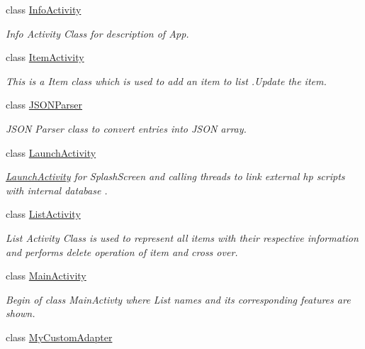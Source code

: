 \begin{DoxyCompactItemize}
class \hyperlink{classcom_1_1example_1_1santh_1_1shoppinglist_1_1_info_activity}{Info\+Activity}
\begin{DoxyCompactList}\small\item\em Info Activity Class for description of App. \end{DoxyCompactList}\item 
class \hyperlink{classcom_1_1example_1_1santh_1_1shoppinglist_1_1_item_activity}{Item\+Activity}
\begin{DoxyCompactList}\small\item\em This is a Item class which is used to add an item to list .Update the item. \end{DoxyCompactList}\item 
class \hyperlink{classcom_1_1example_1_1santh_1_1shoppinglist_1_1_j_s_o_n_parser}{J\+S\+O\+N\+Parser}
\begin{DoxyCompactList}\small\item\em J\+S\+ON Parser class to convert entries into J\+S\+ON array. \end{DoxyCompactList}\item 
class \hyperlink{classcom_1_1example_1_1santh_1_1shoppinglist_1_1_launch_activity}{Launch\+Activity}
\begin{DoxyCompactList}\small\item\em \hyperlink{classcom_1_1example_1_1santh_1_1shoppinglist_1_1_launch_activity}{Launch\+Activity} for Splash\+Screen and calling threads to link external hp scripts with internal database . \end{DoxyCompactList}\item 
class \hyperlink{classcom_1_1example_1_1santh_1_1shoppinglist_1_1_list_activity}{List\+Activity}
\begin{DoxyCompactList}\small\item\em List Activity Class is used to represent all items with their respective information and performs delete operation of item and cross over. \end{DoxyCompactList}\item 
class \hyperlink{classcom_1_1example_1_1santh_1_1shoppinglist_1_1_main_activity}{Main\+Activity}
\begin{DoxyCompactList}\small\item\em Begin of class Main\+Activty where List names and its corresponding features are shown. \end{DoxyCompactList}\item 
class \hyperlink{classcom_1_1example_1_1santh_1_1shoppinglist_1_1_my_custom_adapter}{My\+Custom\+Adapter}

\end{DoxyCompactItemize}

